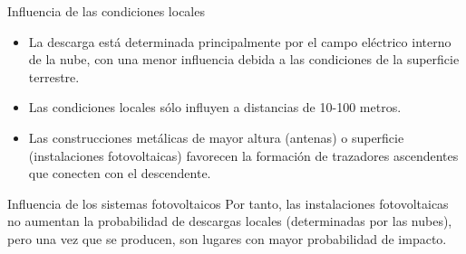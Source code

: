 \documentclass[xcolor={usenames,svgnames,dvipsnames}]{beamer}
\begin{document}
\begin{frame}[label={sec:org735a191}]{Influencia de las condiciones locales}
\begin{itemize}
\item \alert{La descarga está determinada principalmente por el campo eléctrico
interno de la nube}, con una menor influencia debida a las
condiciones de la superficie terrestre.

\item Las \alert{condiciones locales sólo influyen} a distancias de 10-100 metros.

\item Las \alert{construcciones metálicas de mayor altura} (antenas) o superficie
(instalaciones fotovoltaicas) favorecen la formación de trazadores
ascendentes que conecten con el descendente.
\end{itemize}
\end{frame}

\begin{frame}[label={sec:orge638792}]{Influencia de los sistemas fotovoltaicos}
Por tanto, \alert{las instalaciones fotovoltaicas no aumentan la probabilidad
de descargas locales} (determinadas por las nubes), pero una vez que se
producen, son lugares con mayor probabilidad de impacto.
\end{frame}
\end{document}
